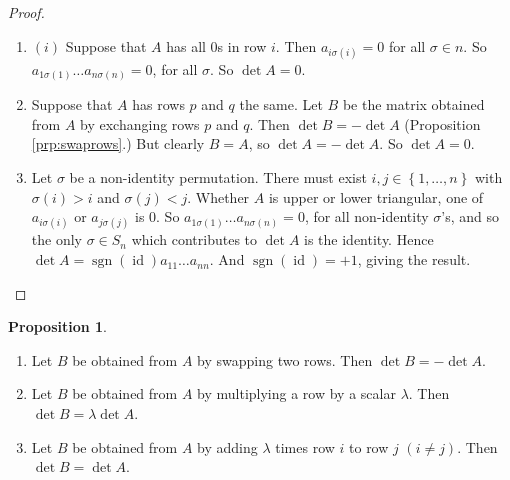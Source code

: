 \documentclass{article}
\theoremstyle{definition}
\newtheorem{proposition}[theorem]{Proposition}
\DeclareMathOperator{\sgn}{sgn}
\DeclareMathOperator{\id}{id}
\begin{document}
     \begin{proof}\hfill
       \begin{enumerate}
         \item 
       $(i)$ Suppose that $A$ has all 0s in row $i$. Then $a_{i\sigma(i)}
       = 0$ for all $\sigma \in n$.
       So $a_{1\sigma(1)}\dots a_{n\sigma(n)} = 0$, for all $\sigma$. So
       $\det A = 0$.
     \item  Suppose that $A$ has rows $p$ and $q$ the same. Let $B$ be the
       matrix obtained
       from $A$ by exchanging rows $p$ and $q$. Then $\det B = -\det A
       $ (Proposition \ref{prp:swaprows}.)
       But clearly $B = A$, so $\det A = -\det A$. So $\det A = 0$.

     \item Let $\sigma$  be a non-identity permutation. There must exist
       $i, j \in \left\{ 1,\dots ,n \right\}$ 
       with $\sigma(i) > i$ and $\sigma(j) < j$. Whether $A$ is upper or
       lower triangular, one of $a_{i\sigma(i)}$ or $a_{j\sigma(j)}$
       is 0. So $a_{1\sigma(1)}\dots a_{n\sigma(n)} = 0$, for all
       non-identity $\sigma$’s, and so
       the only $\sigma \in S_n$ which contributes to $\det A$ is the
       identity. Hence $\det A = \sgn(\id) a_{11}\dots a_{nn}$. And
       $\sgn(\id) = +1$, giving the result.
       \end{enumerate}
     \end{proof}

\begin{proposition}\hfill
  \label{prp:rowops}
  \begin{enumerate}
    \item Let $B$ be obtained from $A$ by swapping two rows. Then $\det B
      = - \det A$.
    \item Let $B$ be obtained from $A$ by multiplying a row by a scalar
      $\lambda$. Then $\det B = \lambda\det A$.
    \item Let $B$ be obtained from $A$ by adding $\lambda$ times row $i$
      to row $j$ $(i \neq j)$.
      Then $\det B = \det A$.
  \end{enumerate}
\end{proposition}
\end{document}
